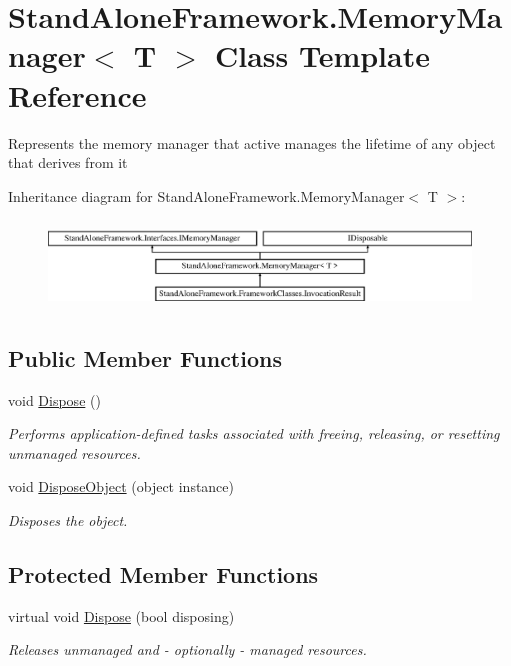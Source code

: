 \hypertarget{class_stand_alone_framework_1_1_memory_manager_3_01_t_01_4}{\section{Stand\+Alone\+Framework.\+Memory\+Manager$<$ T $>$ Class Template Reference}
\label{class_stand_alone_framework_1_1_memory_manager_3_01_t_01_4}
}


Represents the memory manager that active manages the lifetime of any object that derives from it  


Inheritance diagram for Stand\+Alone\+Framework.\+Memory\+Manager$<$ T $>$\+:\begin{figure}[H]
\begin{center}
\leavevmode
\includegraphics[height=2.366197cm]{class_stand_alone_framework_1_1_memory_manager_3_01_t_01_4}
\end{center}
\end{figure}
\subsection*{Public Member Functions}
\begin{DoxyCompactItemize}
\item 
void \hyperlink{class_stand_alone_framework_1_1_memory_manager_3_01_t_01_4_a1efb4ab4f0a190ef25a13b2aaf524267}{Dispose} ()
\begin{DoxyCompactList}\small\item\em Performs application-\/defined tasks associated with freeing, releasing, or resetting unmanaged resources. \end{DoxyCompactList}\item 
void \hyperlink{class_stand_alone_framework_1_1_memory_manager_3_01_t_01_4_ad7aee15edbfecdb55eee947874a8c4cd}{Dispose\+Object} (object instance)
\begin{DoxyCompactList}\small\item\em Disposes the object. \end{DoxyCompactList}\end{DoxyCompactItemize}
\subsection*{Protected Member Functions}
\begin{DoxyCompactItemize}
\item 
virtual void \hyperlink{class_stand_alone_framework_1_1_memory_manager_3_01_t_01_4_a52f69219ea9d645b8246e27b0a82a0a3}{Dispose} (bool disposing)
\begin{DoxyCompactList}\small\item\em Releases unmanaged and -\/ optionally -\/ managed resources. \end{DoxyCompactList}\end{DoxyCompactItemize}
